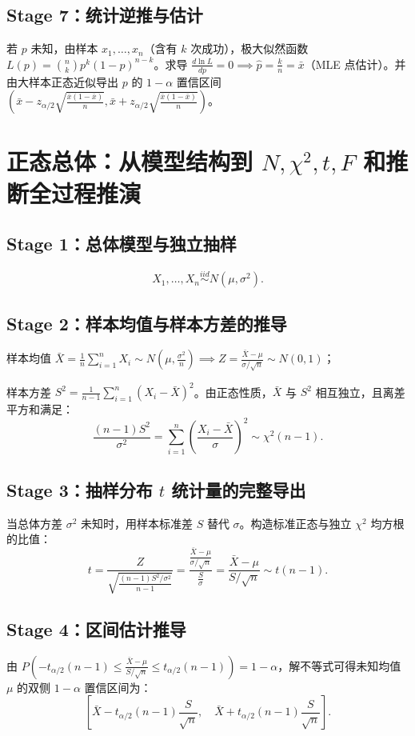 \documentclass[11pt,a4paper,openany]{ctexbook}
\begin{document}
\subsection{Stage 7：统计逆推与估计}
若 $p$ 未知，由样本 $x_1,\dots,x_n$（含有 $k$ 次成功），极大似然函数 $L(p) = \binom{n}{k}p^k(1-p)^{n-k}$。求导 $\frac{d\ln L}{dp} = 0 \implies \hat p = \frac{k}{n} = \bar x$（MLE 点估计）。并由大样本正态近似导出 $p$ 的 $1-\alpha$ 置信区间 $\left( \bar x - z_{\alpha/2}\sqrt{\frac{\bar x(1-\bar x)}{n}}, \bar x + z_{\alpha/2}\sqrt{\frac{\bar x(1-\bar x)}{n}} \right)$。

\section{正态总体：从模型结构到 \texorpdfstring{$N,\chi^2,t,F$}{N, Chi2, t, F} 和推断全过程推演}
\subsection{Stage 1：总体模型与独立抽样}
\[
X_1,\dots,X_n\overset{iid}{\sim}N(\mu,\sigma^2).
\]

\subsection{Stage 2：样本均值与样本方差的推导}
样本均值 $\bar X = \frac{1}{n}\sum_{i=1}^n X_i \sim N\left(\mu, \frac{\sigma^2}{n}\right) \implies Z = \frac{\bar X - \mu}{\sigma/\sqrt{n}} \sim N(0,1)$；

样本方差 $S^2 = \frac{1}{n-1}\sum_{i=1}^n (X_i - \bar X)^2$。由正态性质，$\bar X$ 与 $S^2$ 相互独立，且离差平方和满足：
\[
\frac{(n-1)S^2}{\sigma^2} = \sum_{i=1}^n \left(\frac{X_i-\bar X}{\sigma}\right)^2 \sim \chi^2(n-1).
\]

\subsection{Stage 3：抽样分布 \texorpdfstring{$t$}{t} 统计量的完整导出}
当总体方差 $\sigma^2$ 未知时，用样本标准差 $S$ 替代 $\sigma$。构造标准正态与独立 $\chi^2$ 均方根的比值：
\[
t = \frac{Z}{\sqrt{\frac{(n-1)S^2/\sigma^2}{n-1}}} = \frac{\frac{\bar X - \mu}{\sigma/\sqrt n}}{\frac{S}{\sigma}} = \frac{\bar X - \mu}{S/\sqrt n} \sim t(n-1).
\]

\subsection{Stage 4：区间估计推导}
由 $P\left( -t_{\alpha/2}(n-1) \le \frac{\bar X - \mu}{S/\sqrt n} \le t_{\alpha/2}(n-1) \right) = 1-\alpha$，解不等式可得未知均值 $\mu$ 的双侧 $1-\alpha$ 置信区间为：
\[
\left[ \bar X - t_{\alpha/2}(n-1)\frac{S}{\sqrt n}, \quad \bar X + t_{\alpha/2}(n-1)\frac{S}{\sqrt n} \right].
\]
\end{document}
